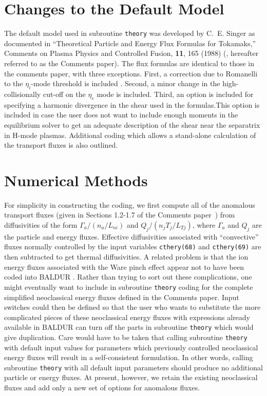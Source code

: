 \section{Changes to the Default Model}
The default model used in subroutine {\tt theory} was developed by
C.~E. Singer as documented
in ``Theoretical Particle and Energy Flux Formulas for Tokamaks,''
Comments on Plasma Physics and Controlled Fusion, {\bf 11}, 165 (1988)
(\cite{Comments}, hereafter referred to as the
Comments paper).  The flux formulas are identical to
those in the comments paper, with three exceptions.  First, a
correction due to Romanelli to the $\eta_{i}$-mode threshold
is included \cite{Romanelli}.
Second, a minor change in the high-collisionally
cut-off on the $\eta_{e}$ mode is included.  Third,
an option is included for specifying a harmonic divergence
in the shear used in the formulas.This option is included in case the user
does not
want to include enough moments in the equilibrium solver to
get an adequate description of the shear near the separatrix in
H-mode plasmas.
Additional coding which allows a stand-alone calculation of the transport
fluxes is also outlined.


\section{Numerical Methods}

For simplicity in constructing the coding, we first compute
all of the anomalous transport fluxes (given in Sections 1.2-1.7 of
the Comments paper~\cite{Comments})
from diffusivities of
the form $\Gamma_{a}/(n_{a}/L_{ni})$ and $Q_{j}/(n_{j}T_{j}/L_{Tj})$,
where $\Gamma_{a}$ and $Q_{j}$ are the particle and energy fluxes.
Effective diffusivities associated with ``convective''
fluxes normally controlled by the input variables {\tt cthery(68)} and
{\tt cthery(69)} are then subtracted to get thermal diffusivities.
A related problem is that the ion energy fluxes associated with
the Ware pinch effect appear not to have been coded into BALDUR
\cite{BALDUR}.  Rather than trying to sort out these complications,
one might eventually want to include in subroutine {\tt theory}
coding for the complete simplified
neoclassical energy fluxes defined in the Comments paper.
Input switches could then be defined so that the user who wants to
substitute the more complicated pieces of these neoclassical
energy fluxes with expressions already available in BALDUR
can turn off the parts in subroutine {\tt theory} which
would give duplication.
Care would have to be taken that calling subroutine {\tt theory}
with default input values for parameters which previously
controlled neoclassical energy fluxes will result
in a self-consistent formulation.  In other words, calling
subroutine {\tt theory}
with all default input parameters should produce no additional
particle or energy fluxes.  At present, however,
we retain the existing neoclassical fluxes and add only
a new set of options for anomalous fluxes.

